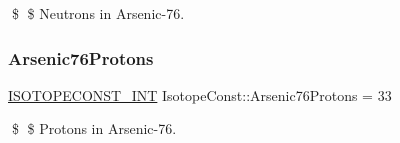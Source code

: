 \$ \$ Neutrons in Arsenic-\/76. \mbox{\label{group___isotope_const-_arsenic-_as76_gaa6252244e653ae48b44b9484ae6ba67e}} 
\subsubsection{\texorpdfstring{Arsenic76\+Protons}{Arsenic76Protons}}
{\footnotesize\ttfamily \mbox{\hyperlink{group___isotope_const-_macros_ga5f18360b3e99483a35c32d789e62621c}{I\+S\+O\+T\+O\+P\+E\+C\+O\+N\+S\+T\+\_\+\+I\+NT}} Isotope\+Const\+::\+Arsenic76\+Protons = 33}

\$ \$ Protons in Arsenic-\/76. 